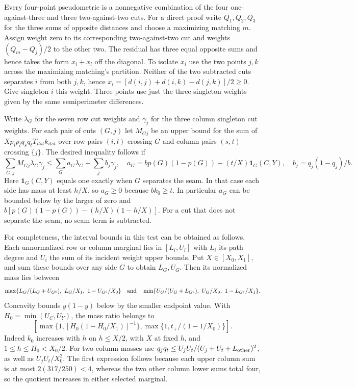 \documentclass[11pt,a4paper]{article}
\theoremstyle{definition}
\begin{document}
Every four-point pseudometric is a nonnegative combination of the four
one-against-three and three two-against-two cuts. For a direct proof
write $Q_1,Q_2,Q_3$ for the three sums of opposite distances and choose
a maximizing matching $m$. Assign weight zero to its corresponding
two-against-two cut and weights $(Q_m-Q_j)/2$ to the other two.
The residual has three equal opposite sums and hence takes the form
$x_i+x_l$ off the diagonal. To isolate $x_i$ use the two points $j,k$
across the maximizing matching's partition. Neither of the two subtracted
cuts separates $i$ from both $j,k$, hence
$x_i=[d(i,j)+d(i,k)-d(j,k)]/2\ge0$. Give singleton $i$ this weight.
Three points use just the three singleton weights given by the same
semiperimeter differences.

Write $\lambda_G$ for the seven row cut weights and $\gamma_j$ for the
three column singleton cut weights. For each pair of cuts $(G,j)$ let
$M_{Gj}$ be an upper bound for the sum of
$X p_i p_l q_s q_t T_{ilst}k_{ilst}$ over row pairs $(i,l)$
crossing $G$ and column pairs $(s,t)$ crossing $\{j\}$. The desired
inequality follows if
\[
 \sum_{G,j}M_{Gj}\lambda_G\gamma_j\le
          \sum_G a_G\lambda_G+\sum_j b_j\gamma_j,\quad
 a_G=b p(G)(1-p(G))-(t/X)\mathbf1_G(C,Y),\quad
 b_j=q_j(1-q_j)/b .
\]
Here $\mathbf1_G(C,Y)$ equals one exactly when $G$ separates the seam.
In that case each side has mass at least $h/X$, so $a_G\ge0$
because $bk_0\ge t$. In particular $a_G$ can be bounded below by the
larger of zero and
$b[p(G)(1-p(G))-(h/X)(1-h/X)]$. For a cut that does not separate the
seam, no seam term is subtracted.

For completeness, the interval bounds in this test can be obtained as
follows. Each unnormalized row or column marginal lies in $[L_i,U_i]$
with $L_i$ its path degree and $U_i$ the sum of its incident weight
upper bounds. Put $X\in[X_0,X_1]$, and sum these bounds over any side
$G$ to obtain $L_G,U_G$. Then its normalized mass lies between
\[
 \max\{L_G/(L_G+U_{G^c}),\ L_G/X_1,\ 1-U_{G^c}/X_0\}
 \quad\hbox{and}\quad
 \min\{U_G/(U_G+L_{G^c}),\ U_G/X_0,\ 1-L_{G^c}/X_1\}.
\]
Concavity bounds $y(1-y)$ below by the smaller endpoint value.
With $H_0=\min(U_C,U_Y)$, the mass ratio belongs to
\[
 \left[\max\{1,[H_0(1-H_0/X_1)]^{-1}\},       \max\{1,t_+/(1-1/X_0)\}\right].
\]
Indeed $k_0$ increases with $h$ on $h\le X/2$, with $X$ at fixed
$h$, and $1\le h\le H_0<X_0/2$. For two column masses use
$q_jq_t\le U_jU_t/(U_j+U_t+L_{\rm other})^2$, as well as
$U_jU_t/X_0^2$. The first expression follows because each upper column
sum is at most $2(317/250)<4$, whereas the two other column lower sums
total four, so the quotient increases in either selected marginal.
\end{document}
